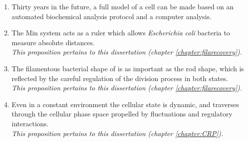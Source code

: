 \begin{enumerate}[nosep]
    \item Thirty years in the future, a full model of a cell can be made based on an automated biochemical analysis protocol and a computer analysis.
    \item The Min system acts as a ruler which allows \textit{Escherichia coli} bacteria to measure absolute distances.\\
    \textit{This proposition pertains to this dissertation (chapter \ref{chapter:filarecovery}).}
    \item 
    The filamentous bacterial shape of \ecoli is as important as the rod shape, 
    which is reflected by 
    the careful regulation of the division process in both states.\\
    \textit{This proposition pertains to this dissertation (chapter \ref{chapter:filarecovery}).}
    \item 
    Even in a constant environment  
    the cellular state is dynamic,
    and traverses through the cellular phase space propelled by fluctuations and regulatory interactions.\\
    \textit{This proposition pertains to this dissertation (chapter \ref{chapter:CRP}).}

\end{enumerate}
